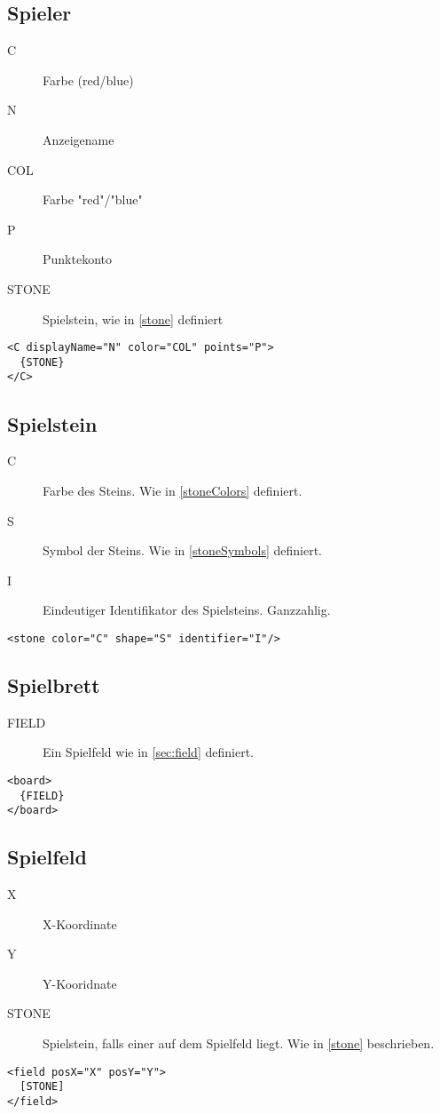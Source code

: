 \documentclass[12pt,a4paper, ngerman, oneside]{scrartcl}
\begin{document}
\subsection{\label{player}Spieler}
\begin{description}
\item[C] Farbe (red/blue)
\item[N] Anzeigename
\item[COL] Farbe "red"/"blue"
\item[P] Punktekonto
\item[STONE] Spielstein, wie in \ref{stone} definiert
\end{description}
\begin{verbatim}
<C displayName="N" color="COL" points="P">
  {STONE}
</C>
\end{verbatim}


\subsection{\label{stone}Spielstein}
\begin{description}
\item[C] Farbe des Steins. Wie in \ref{stoneColors} definiert.
\item[S] Symbol der Steins. Wie in \ref{stoneSymbols} definiert.
\item[I] Eindeutiger Identifikator des Spielsteins. Ganzzahlig.
\end{description}
\begin{verbatim} 
<stone color="C" shape="S" identifier="I"/>
\end{verbatim}

\subsection{\label{board}Spielbrett}
\begin{description}
\item[FIELD] Ein Spielfeld wie in \ref{sec:field} definiert.
\end{description}
\begin{verbatim}
<board>
  {FIELD}
</board>
\end{verbatim}

\subsection{\label{sec:field}Spielfeld}
\begin{description}
\item[X] X-Koordinate
\item[Y] Y-Kooridnate
\item[STONE] Spielstein, falls einer auf dem Spielfeld liegt. Wie in \ref{stone} beschrieben.
\end{description}
\begin{verbatim}
<field posX="X" posY="Y">
  [STONE]
</field>
\end{verbatim}
\end{document}
